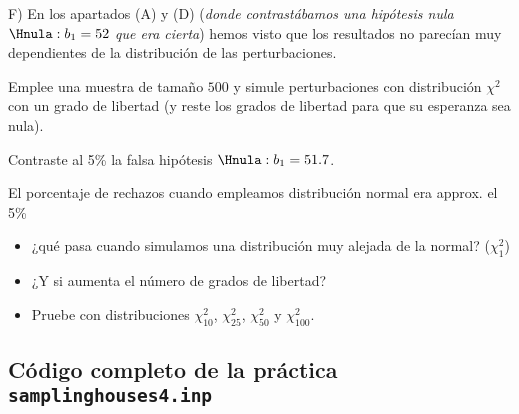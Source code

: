 \documentclass[11pt]{article}
\begin{document}
F) En los apartados (A) y (D) (\emph{donde contrastábamos una hipótesis
  nula \(\Hnula: b_1=52\) que era cierta}) hemos visto que los
  resultados no parecían muy dependientes de la distribución de las
  perturbaciones.

Emplee una muestra de tamaño \(500\) y simule perturbaciones con
distribución \(\chi^2\) con un grado de libertad (y reste los grados
de libertad para que su esperanza sea nula).

Contraste al 5\% la falsa hipótesis \(\Hnula: b_1=51.7\).

El porcentaje de rechazos cuando empleamos distribución normal era
approx. el 5\%

\begin{itemize}
\item ¿qué pasa cuando simulamos una distribución muy alejada de la
normal? (\(\chi^2_1\))
\item ¿Y si aumenta el número de grados de libertad?
\item Pruebe con distribuciones \(\chi^2_{10}\), \(\chi^2_{25}\),
\(\chi^2_{50}\) y \(\chi^2_{100}\).
\end{itemize}

\vspace{10pt}
\noindent
\subsection{Código completo de la práctica \texttt{samplinghouses4.inp}}
\label{sec:org4f0d3d2}
\vspace{10pt}

\clearpage
\end{document}
